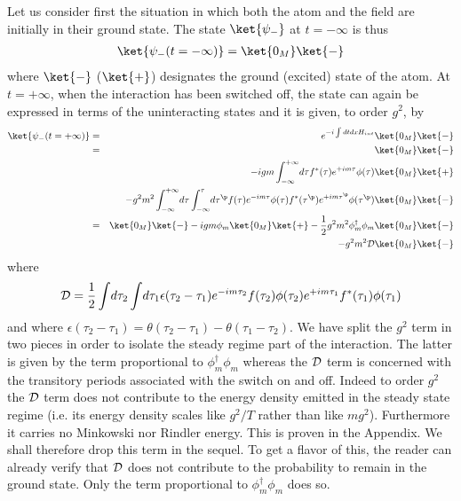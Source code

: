 \documentclass[12pt]{article}
\begin{document}
Let us consider first the situation in which both
 the atom and the field are initially in their ground state. The state
$\ket{\psi_-}$
at $t=-\infty$ is
thus
\begin{eqnarray}
\ket{\psi_-(t=-\infty)} = \ket{0_M} \ket{-}
\end{eqnarray}
where $\ket{-}$ ($\ket{+}$) designates the ground (excited)
state of the atom.
At $t=+\infty$, when the interaction has been switched off, the state
can again be expressed in terms of the uninteracting states and it is
given, to order $g^2$,
by
\begin{eqnarray}
\ket{\psi_-(t=+\infty)} &=&  e^{-i \int dt dx H_{int}}\ket{0_M} \ket{-}
\nonumber \\
&=& \ket{0_M} \ket{-}\nonumber\\
& & -ig m \int_{-\infty}^{+\infty}\!
d\tau   f^*(\tau) e^{+im\tau}  \phi(\tau)\ket{0_M} \ket{+}\nonumber \\
& & - g^2 m^2
\int_{-\infty}^{+\infty}\!
d\tau
\int_{-\infty}^{\tau}\!
d\tau^\p f(\tau) e^{-im\tau}  \phi(\tau)
  f^*(\tau^\p) e^{+im\tau^\p}  \phi(\tau^\p)\ket{0_M}
\ket{-}\nonumber \\
&=& \ket{0_M} \ket{-}  -ig m \phi_m \ket{0_M}\ket{+}- {1 \over 2} g^2 m^2
\phi_m^\dagger \phi_m \ket{0_M}\ket{-}
\nonumber \\& &-  g^2 m^2
{\cal D}  \ket{0_M}\ket{-}
\label{state}
\end{eqnarray}
where
\begin{equation}
{\cal D} = {1 \over 2}
\int \! d\tau_2
\int \! d \tau_1 \epsilon(\tau_2 - \tau_1) e^{-i m \tau_2} f(\tau_2)
\phi(\tau_2) e^{+i m \tau_1} f^*(\tau_1) \phi(\tau_1)
\label{calD}
\end{equation}
and where $\epsilon(\tau_2 - \tau_1) = \theta(\tau_2 - \tau_1) -
\theta(\tau_1 - \tau_2 )$.
We have split the $g^2$ term in two pieces
in order to isolate the steady regime
part of the interaction.
The latter is given by the term proportional
to $\phi_m^\dagger \phi_m$
whereas the ${\cal {D}}$ term is concerned with the transitory periods
associated with the switch on and off. Indeed to order $g^2$ the  ${\cal D}$
term
does not contribute to the energy density emitted in the
steady state regime (i.e. its energy density scales like $g^2/T$ rather than
like $mg^2$).
Furthermore it carries no Minkowski nor Rindler energy. This is
proven
in the Appendix. We shall therefore drop this term
in the sequel.
To get a flavor of this, the reader can
already verify that $\cal{D}$ does not contribute to the probability
to remain in the ground state. Only the term proportional to
$\phi_m^\dagger \phi_m$ does so.
\end{document}
